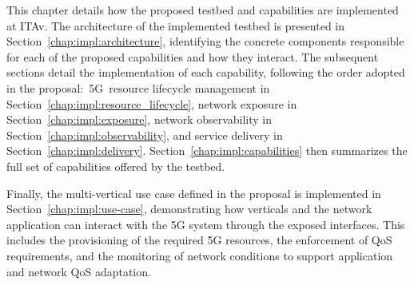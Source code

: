 This chapter details how the proposed testbed and capabilities are implemented at \acs{ITAv}. The architecture of the implemented testbed is presented in Section~\ref{chap:impl:architecture}, identifying the concrete components responsible for each of the proposed capabilities and how they interact. The subsequent sections detail the implementation of each capability, following the order adopted in the proposal:~\acs{5G}~resource lifecycle management in Section~\ref{chap:impl:resource_lifecycle}, network exposure in Section~\ref{chap:impl:exposure}, network observability in Section~\ref{chap:impl:observability}, and service delivery in Section~\ref{chap:impl:delivery}. Section~\ref{chap:impl:capabilities} then summarizes the full set of capabilities offered by the testbed.

Finally, the multi-vertical use case defined in the proposal is implemented in Section~\ref{chap:impl:use-case}, demonstrating how verticals and the network application can interact with the \acs{5G} system through the exposed interfaces. This includes the provisioning of the required \acs{5G} resources, the enforcement of \acs{QoS} requirements, and the monitoring of network conditions to support application and network \acs{QoS} adaptation.
